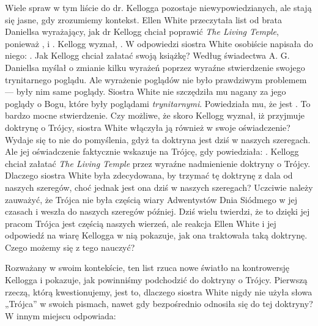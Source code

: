 Wiele spraw w tym liście do dr. Kellogga pozostaje niewypowiedzianych, ale stają się jasne, gdy zrozumiemy kontekst. Ellen White przeczytała list od brata Daniellsa wyrażający, jak dr Kellogg chciał poprawić \textit{The Living Temple}, ponieważ , i . Kellogg wyznał, . W odpowiedzi siostra White osobiście napisała do niego: . Jak Kellogg chciał załatać swoją książkę? Według świadectwa A. G. Daniellsa myślał o zmianie kilku wyrażeń poprzez wyraźne stwierdzenie swojego trynitarnego poglądu. Ale wyrażenie poglądów nie było prawdziwym problemem — były nim same poglądy. Siostra White nie szczędziła mu nagany za jego poglądy o Bogu, które były poglądami \textit{trynitarnymi}. Powiedziała mu, że jest . To bardzo mocne stwierdzenie. Czy możliwe, że skoro Kellogg wyznał, iż przyjmuje doktrynę o Trójcy, siostra White włączyła ją również w swoje oświadczenie? Wydaje się to nie do pomyślenia, gdyż ta doktryna jest dziś w naszych szeregach. Ale jej oświadczenie faktycznie wskazuje na Trójcę, gdy powiedziała: . Kellogg chciał załatać \textit{The Living Temple} przez wyraźne nadmienienie doktryny o Trójcy. Dlaczego siostra White była zdecydowana, by trzymać tę doktrynę z dala od naszych szeregów, choć jednak jest ona dziś w naszych szeregach? Uczciwie należy zauważyć, że Trójca nie była częścią wiary Adwentystów Dnia Siódmego w jej czasach i weszła do naszych szeregów później. Dziś wielu twierdzi, że to dzięki jej pracom Trójca jest częścią naszych wierzeń, ale reakcja Ellen White i jej odpowiedź na wiarę Kellogga w nią pokazuje, jak ona traktowała taką doktrynę. Czego możemy się z tego nauczyć?

Rozważany w swoim kontekście, ten list rzuca nowe światło na kontrowersję Kellogga i pokazuje, jak powinniśmy podchodzić do doktryny o Trójcy. Pierwszą rzeczą, którą kwestionujemy, jest to, dlaczego siostra White nigdy nie użyła słowa „Trójca” w swoich pismach, nawet gdy bezpośrednio odnosiła się do tej doktryny? W innym miejscu odpowiada:

